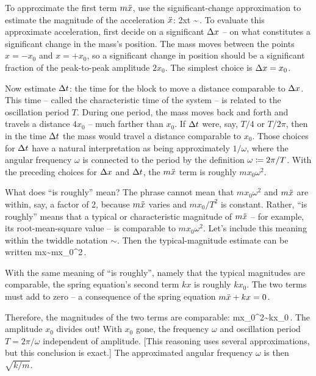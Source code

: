 To approximate the first term $m\ddot{x}$, use the significant-change approximation to estimate the magnitude of the acceleration $\ddot{x}$:
\beq
\nxod 2xt \sim {}\,.
\eeq
To evaluate this approximate acceleration, first decide on a significant $\Delta x$ -- on what constitutes a significant change in the mass's position. The mass moves between the points $x = -x_0$ and $x = +x_0$, so a significant change in position should be a significant fraction of the peak-to-peak amplitude $2x_0$. The simplest choice is $\Delta x = x_0$.

Now estimate $\Delta t$: the time for the block to move a distance comparable to $\Delta x$. This time -- called the characteristic time of the system -- is related to the oscillation period $T$. During one period, the mass moves back and forth and travels a distance $4x_0$ -- much farther than $x_0$. If $\Delta t$ were, say, $T/4$ or $T/2\pi$, then in the time $\Delta t$ the mass would travel a distance comparable to $x_0$. Those choices for $\Delta t$ have a natural interpretation as being approximately $1/\omega$, where the angular frequency $\omega$ is connected to the period by the definition $\omega \coloneqq 2\pi/T$. With the preceding choices for $\Delta x$ and $\Delta t$, the $m\ddot{x}$ term is roughly $mx_0\omega^2$.

What does ``is roughly'' mean? The phrase cannot mean that $mx_0\omega^2$ and $m\ddot{x}$ are within, say, a factor of 2, because $m\ddot{x}$ varies and $mx_0/T^2$ is constant. Rather, ``is roughly'' means that a typical or characteristic magnitude of $m\ddot{x}$ -- for example, its root-mean-square value -- is comparable to $mx_0\omega^2$. Let's include this meaning within the twiddle notation $\sim$. Then the typical-magnitude estimate can be written
\beq
m\ddt x\sim mx_0\omega^2\,.
\eeq

With the same meaning of ``is roughly'', namely that the typical magnitudes are comparable, the spring equation's second term $kx$ is roughly $kx_0$. The two terms must add to zero -- a consequence of the spring equation $m\ddot{x} + kx = 0$.

Therefore, the magnitudes of the two terms are comparable:
\beq
mx_0\omega^2\sim kx_0\,.
\eeq
The amplitude $x_0$ divides out! With $x_0$ gone, the frequency $\omega$ and oscillation period $T = 2\pi/\omega$ independent of amplitude. [This reasoning uses several approximations, but this conclusion is exact.] The approximated angular frequency $\omega$ is then $\sqrt{k/m}$.

